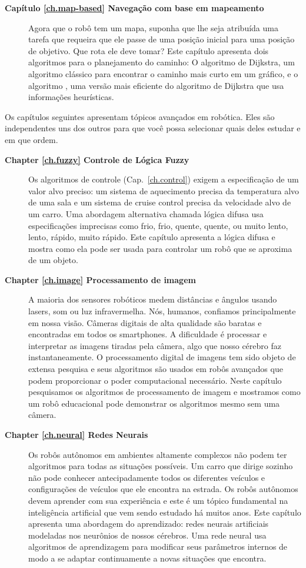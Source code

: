 \begin{description}
\smallskip
\item [\textbf{Capítulo \ref{ch.map-based} Navegação com base em mapeamento}] Agora que o robô tem um mapa, suponha que lhe seja atribuída uma tarefa que requeira que ele passe de uma posição inicial para uma posição de objetivo. Que rota ele deve tomar? Este capítulo apresenta dois algoritmos para o planejamento do caminho: O algoritmo de Dijkstra, um algoritmo clássico para encontrar o caminho mais curto em um gráfico, e o algoritmo \astar{}, uma versão mais eficiente do algoritmo de Dijkstra que usa informações heurísticas.
\end{description}

Os capítulos seguintes apresentam tópicos avançados em robótica. Eles são independentes uns dos outros para que você possa selecionar quais deles estudar e em que ordem.
\begin{description}
\item [\textbf{Chapter \ref{ch.fuzzy} Controle de Lógica Fuzzy}] Os algoritmos de controle (Cap.~\ref{ch.control}) exigem a especificação de um valor alvo preciso: um sistema de aquecimento precisa da temperatura alvo de uma sala e um sistema de cruise control precisa da velocidade alvo de um carro. Uma abordagem alternativa chamada lógica difusa usa especificações imprecisas como frio, frio, quente, quente, ou muito lento, lento, rápido, muito rápido. Este capítulo apresenta a lógica difusa e mostra como ela pode ser usada para controlar um robô que se aproxima de um objeto.
\smallskip
\item [\textbf{Chapter \ref{ch.image} Processamento de imagem}] A maioria dos sensores robóticos medem distâncias e ângulos usando lasers, som ou luz infravermelha. Nós, humanos, confiamos principalmente em nossa visão. Câmeras digitais de alta qualidade são baratas e encontradas em todos os smartphones. A dificuldade é processar e interpretar as imagens tiradas pela câmera, algo que nosso cérebro faz instantaneamente. O processamento digital de imagens tem sido objeto de extensa pesquisa e seus algoritmos são usados em robôs avançados que podem proporcionar o poder computacional necessário. Neste capítulo pesquisamos os algoritmos de processamento de imagem e mostramos como um robô educacional pode demonstrar os algoritmos mesmo sem uma câmera.
\smallskip
\item [\textbf{Chapter \ref{ch.neural} Redes Neurais}] Os robôs autônomos em ambientes altamente complexos não podem ter algoritmos para todas as situações possíveis. Um carro que dirige sozinho não pode conhecer antecipadamente todos os diferentes veículos e configurações de veículos que ele encontra na estrada. Os robôs autônomos devem aprender com sua experiência e este é um tópico fundamental na inteligência artificial que vem sendo estudado há muitos anos. Este capítulo apresenta uma abordagem do aprendizado: redes neurais artificiais modeladas nos neurônios de nossos cérebros. Uma rede neural usa algoritmos de aprendizagem para modificar seus parâmetros internos de modo a se adaptar continuamente a novas situações que encontra.

\end{description}
